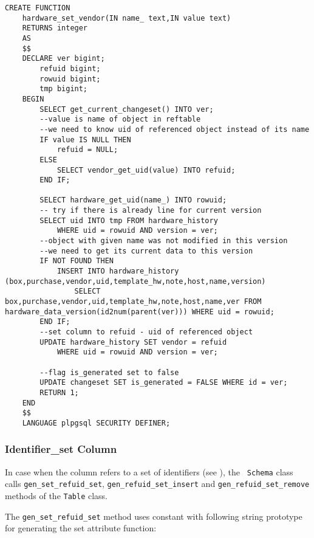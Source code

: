 \documentclass[deska]{subfiles}
\begin{document}
\begin{verbatim}
CREATE FUNCTION
    hardware_set_vendor(IN name_ text,IN value text)
    RETURNS integer
    AS
    $$
    DECLARE ver bigint;
        refuid bigint;
        rowuid bigint;
        tmp bigint;
    BEGIN
        SELECT get_current_changeset() INTO ver;
        --value is name of object in reftable
        --we need to know uid of referenced object instead of its name
        IF value IS NULL THEN
            refuid = NULL;
        ELSE
            SELECT vendor_get_uid(value) INTO refuid;
        END IF;

        SELECT hardware_get_uid(name_) INTO rowuid;
        -- try if there is already line for current version
        SELECT uid INTO tmp FROM hardware_history
            WHERE uid = rowuid AND version = ver;
        --object with given name was not modified in this version
        --we need to get its current data to this version
        IF NOT FOUND THEN
            INSERT INTO hardware_history (box,purchase,vendor,uid,template_hw,note,host,name,version)
                SELECT box,purchase,vendor,uid,template_hw,note,host,name,ver FROM hardware_data_version(id2num(parent(ver))) WHERE uid = rowuid;
        END IF;
        --set column to refuid - uid of referenced object
        UPDATE hardware_history SET vendor = refuid
            WHERE uid = rowuid AND version = ver;

        --flag is_generated set to false
        UPDATE changeset SET is_generated = FALSE WHERE id = ver;
        RETURN 1;
    END
    $$
    LANGUAGE plpgsql SECURITY DEFINER;
\end{verbatim}

\subsubsection{Identifier\_set Column}

In case when the column refers to a set of identifiers (see ), the {\tt
Schema} class calls {\tt gen\_set\_refuid\_set},  {\tt gen\_refuid\_set\_insert} and {\tt gen\_refuid\_set\_remove}
methods of the {\tt Table} class.

The {\tt gen\_set\_refuid\_set} method uses constant with following string prototype for generating the set attribute
function:
\end{document}
